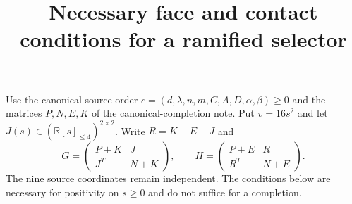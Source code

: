 \documentclass[11pt]{article}
\title{Necessary face and contact conditions for a ramified selector}
\author{}\date{}
\newcommand{\R}{\mathbb R}
\begin{document}
\maketitle\vspace{-2em}
Use the canonical source order
$c=(d,\lambda,n,m,C,A,D,\alpha,\beta)\ge0$ and the matrices $P,N,E,K$
of the canonical-completion note. Put $v=16s^2$ and let
$J(s)\in(\R[s]_{\le4})^{2\times2}$. Write $R=K-E-J$ and
\[
 G=\begin{pmatrix}P+K&J\\J^T&N+K\end{pmatrix},\qquad
 H=\begin{pmatrix}P+E&R\\R^T&N+E\end{pmatrix}.
\]
The nine source coordinates remain independent. The conditions below
are necessary for positivity on $s\ge0$ and do not suffice for a completion.
\end{document}
